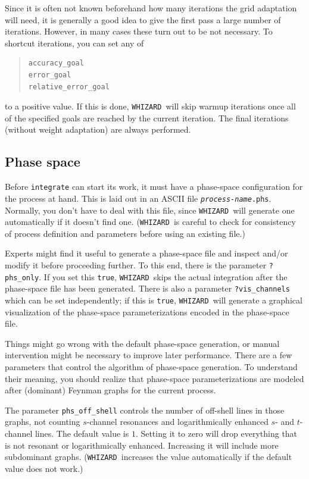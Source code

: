 \documentclass[12pt]{book}
\newcommand{\ttt}[1]{\texttt{#1}}
\newcommand{\whizard}{\texttt{WHIZARD}}
\begin{document}
Since it is often not known beforehand how many iterations the grid
adaptation will need, it is generally a good idea to give the first
pass a large number of iterations.  However, in many cases these turn
out to be not necessary.  To shortcut iterations, you can set any of
\begin{quote}
\begin{footnotesize}
\begin{verbatim}
accuracy_goal
error_goal
relative_error_goal
\end{verbatim}
\end{footnotesize}
\end{quote}
to a positive value.  If this is done, \whizard\ will skip warmup
iterations once all of the specified goals are reached by the current
iteration.  The final iterations (without weight adaptation) are
always performed.


\subsection{Phase space}

Before \ttt{integrate} can start its work, it must have a phase-space
configuration for the process at hand.  This is laid out in an ASCII file
\ttt{\textit{process-name}.phs}.  Normally, you don't have to deal with this
file, since \whizard\ will generate one automatically if it doesn't find one.
(\whizard\ is careful to check for consistency of process definition and
parameters before using an existing file.)  

Experts might find it useful to generate a phase-space file and inspect and/or
modify it before proceeding further.  To this end, there is the parameter
\verb|?phs_only|.  If you set this \ttt{true}, \whizard\ skips the actual
integration after the phase-space file has been generated.  There is also a
parameter \verb|?vis_channels| which can be set independently; if this is
\ttt{true}, \whizard\ will generate a graphical visualization of the
phase-space parameterizations encoded in the phase-space file.

Things might go wrong with the default phase-space generation, or manual
intervention might be necessary to improve later performance.  There are a few
parameters that control the algorithm of phase-space generation.  To
understand their meaning, you should realize that phase-space
parameterizations are modeled after (dominant) Feynman graphs for the current
process.  

The parameter \verb|phs_off_shell| controls the number of off-shell lines in
those graphs, not counting $s$-channel resonances and logarithmically enhanced
$s$- and $t$-channel lines.  The default value is $1$.  Setting it to zero
will drop everything that is not resonant or logarithmically enhanced.
Increasing it will include more subdominant graphs.  (\whizard\ increases the
value automatically if the default value does not work.)
\end{document}

